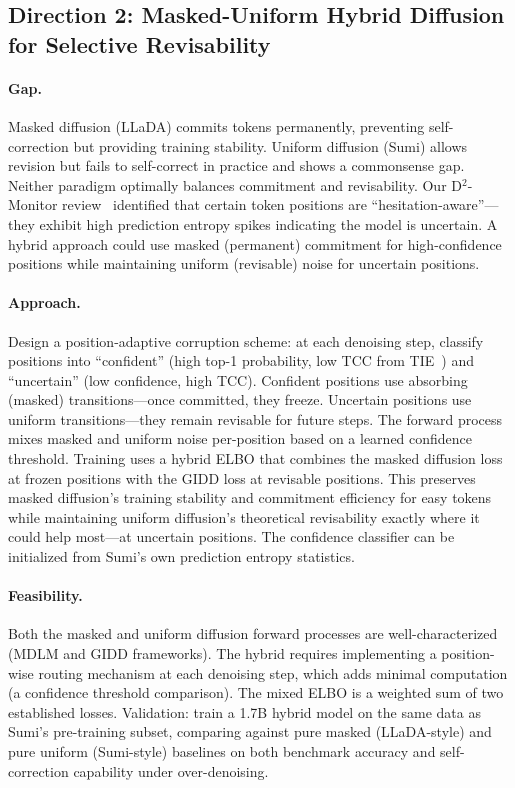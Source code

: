 \documentclass[11pt,a4paper]{article}
\begin{document}
\subsection{Direction 2: Masked-Uniform Hybrid Diffusion for Selective Revisability}

\paragraph{Gap.} Masked diffusion (LLaDA) commits tokens permanently, preventing self-correction but providing training stability. Uniform diffusion (Sumi) allows revision but fails to self-correct in practice and shows a commonsense gap. Neither paradigm optimally balances commitment and revisability. Our D$^2$-Monitor review~\cite{liu2026d2monitor} identified that certain token positions are ``hesitation-aware''---they exhibit high prediction entropy spikes indicating the model is uncertain. A hybrid approach could use masked (permanent) commitment for high-confidence positions while maintaining uniform (revisable) noise for uncertain positions.

\paragraph{Approach.} Design a position-adaptive corruption scheme: at each denoising step, classify positions into ``confident'' (high top-1 probability, low TCC from TIE~\cite{yun2026tie}) and ``uncertain'' (low confidence, high TCC). Confident positions use absorbing (masked) transitions---once committed, they freeze. Uncertain positions use uniform transitions---they remain revisable for future steps. The forward process mixes masked and uniform noise per-position based on a learned confidence threshold. Training uses a hybrid ELBO that combines the masked diffusion loss at frozen positions with the GIDD loss at revisable positions. This preserves masked diffusion's training stability and commitment efficiency for easy tokens while maintaining uniform diffusion's theoretical revisability exactly where it could help most---at uncertain positions. The confidence classifier can be initialized from Sumi's own prediction entropy statistics.

\paragraph{Feasibility.} Both the masked and uniform diffusion forward processes are well-characterized (MDLM and GIDD frameworks). The hybrid requires implementing a position-wise routing mechanism at each denoising step, which adds minimal computation (a confidence threshold comparison). The mixed ELBO is a weighted sum of two established losses. Validation: train a 1.7B hybrid model on the same data as Sumi's pre-training subset, comparing against pure masked (LLaDA-style) and pure uniform (Sumi-style) baselines on both benchmark accuracy and self-correction capability under over-denoising.
\end{document}
